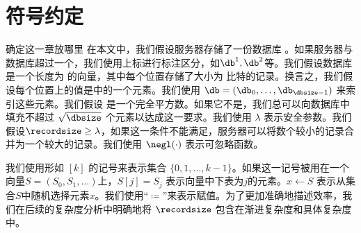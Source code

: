 \section{符号约定}
{确定这一章放哪里}
在本文中，我们假设服务器\server 存储了一份数据库 \db。如果服务器与数据库超过一个，我们使用上标进行标注区分，如$\db^{1},\db^{2}$等。我们假设数据库是一个长度为 \dbsize 的向量，其中每个位置存储了大小为 \recordsize 比特的记录。换言之，我们假设每个位置上的值是\recordfield 中的一个元素。我们使用 $\db = (\db_0,\dots,\db_{\dbsize-1})$ 来索引这些元素。我们假设 \dbsize 是一个完全平方数。如果它不是，我们总可以向数据库中填充不超过 $\sqrt{\dbsize}$ 个元素以达成这一要求。我们使用 $\lambda$ 表示安全参数。我们假设$\recordsize \ge \lambda$，如果这一条件不能满足，服务器可以将数个较小的记录合并为一个较大的记录。我们使用 $\negl(\cdot)$ 表示可忽略函数。

我们使用形如 $[k]$ 的记号来表示集合 $\{0,1,\dots,k-1\}$。如果这一记号被用在一个向量$S = (S_0, S_1, \dots)$上，$S[j]=S_j$ 表示向量中下表为$j$的元素。$x\leftarrow S$ 表示从集合$S$中随机选择元素$x$。我们使用``$\coloneqq$''来表示赋值。为了更加准确地描述效率，我们在后续的复杂度分析中明确地将 $\recordsize$ 包含在渐进复杂度和具体复杂度中。
